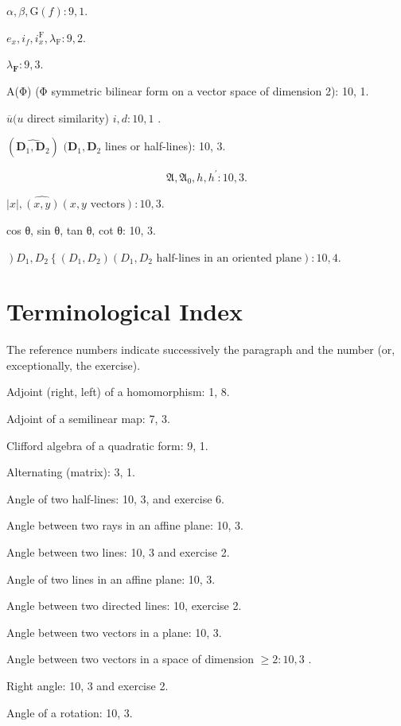 \(\alpha, \beta, \mathrm{G}(f): 9, 1.\)

\(e_x, i_f, i_x^{\mathrm{F}}, \lambda_{\mathrm{F}}: 9, 2.\)

\(\lambda_{\mathbf{F}}:9,3.\)

A(Φ) (Φ symmetric bilinear form on a vector space of dimension 2): 10, 1.

\(\overline{u} (u\) direct similarity) \(i,d:10,1\) .

\((\widehat{\mathbf{D}_1,\mathbf{D}_2})\) \((\mathbf{D}_1,\mathbf{D}_2\) lines or half-lines): 10, 3.

\[
\mathfrak {A}, \mathfrak {A} _ {0}, h, h ^ {\prime}: 1 0, 3.
\]

\(|x|, \widehat{(x,y)}(x,y\text{ vectors}):10,3.\)

cos θ, sin θ, tan θ, cot θ: 10, 3.

\(\left.\right)D_{1}, D_{2}\left\{\left(D_{1}, D_{2}\right)\left(D_{1}, D_{2} \text{ half-lines in an oriented plane}\right): 10, 4.\right.\)

\chapter*{Terminological Index}
{}

The reference numbers indicate successively the paragraph and the number (or, exceptionally, the exercise).

Adjoint (right, left) of a homomorphism: 1, 8.

Adjoint of a semilinear map: 7, 3.

Clifford algebra of a quadratic form: 9, 1.

Alternating (matrix): 3, 1.

Angle of two half-lines: 10, 3, and exercise 6.

Angle between two rays in an affine plane: 10, 3.

Angle between two lines: 10, 3 and exercise 2.

Angle of two lines in an affine plane: 10, 3.

Angle between two directed lines: 10, exercise 2.

Angle between two vectors in a plane: 10, 3.

Angle between two vectors in a space of dimension \(\geqslant 2:10,3\) .

Right angle: 10, 3 and exercise 2.

Angle of a rotation: 10, 3.

